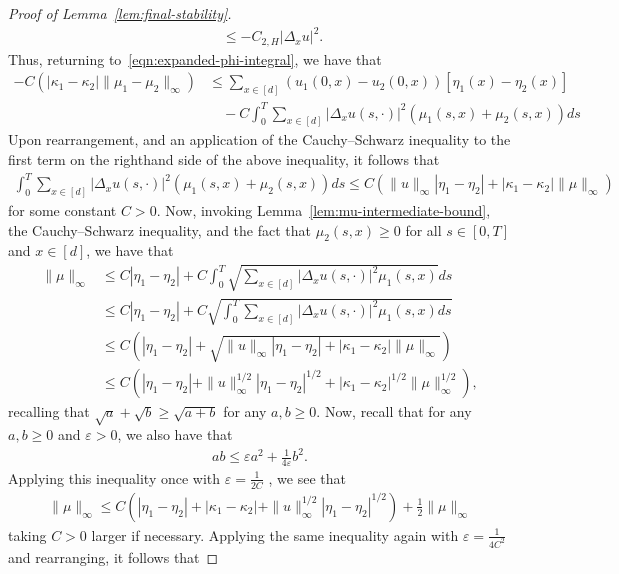 \documentclass[11pt,reqno]{amsart}
\numberwithin{equation}{section}
\theoremstyle{plain}
\newcommand{\1}{\boldsymbol{\mathbbm{1}}}
\begin{document}
\begin{proof}[Proof of Lemma~\ref{lem:final-stability}]
\begin{align*}
    &\quad \leq -C_{2, H} |\Delta_x u|^2.
\end{align*}
Thus, returning to~\eqref{eqn:expanded-phi-integral}, we have that
\begin{align*}
    -C(|\kappa_1 - \kappa_2| \|\mu_1 - \mu_2\|_\infty) &\leq \sum_{x \in [d]} (u_1(0, x) - u_2(0, x)) [\eta_1(x) - \eta_2(x)] \\
    &\quad - C\int_0^T \sum_{x \in [d]} |\Delta_x u(s, \cdot)|^2 (\mu_1(s, x) + \mu_2(s, x)) ds
\end{align*}
Upon rearrangement, and an application of the Cauchy--Schwarz inequality to the first term on the righthand side of the above inequality, it follows that
\begin{align*}
    \int_0^T \sum_{x \in [d]} |\Delta_x u(s, \cdot)|^2 (\mu_1(s, x) + \mu_2(s, x)) ds \leq C(\|u\|_\infty |\eta_1 - \eta_2| + |\kappa_1 - \kappa_2| \|\mu\|_\infty)
\end{align*}
for some constant $C > 0$. Now, invoking Lemma~\ref{lem:mu-intermediate-bound}, the Cauchy--Schwarz inequality, and the fact that $\mu_2(s, x) \geq 0$ for all $s \in [0, T]$ and $x \in [d]$, we have that
\begin{align*}
    \|\mu\|_\infty &\leq C|\eta_1 - \eta_2| + C \int_0^T \sqrt{\sum_{x \in [d]} |\Delta_x u(s, \cdot)|^2 \mu_1(s, x)} ds \\
    &\leq C|\eta_1 - \eta_2| + C \sqrt{\int_0^T \sum_{x \in [d]} |\Delta_x u(s, \cdot)|^2 \mu_1(s, x) ds} \\
    &\leq C(|\eta_1 - \eta_2| + \sqrt{\|u\|_\infty |\eta_1 - \eta_2| + |\kappa_1 - \kappa_2| \|\mu\|_\infty}) \\
    &\leq C(|\eta_1 - \eta_2| + \|u\|_\infty^{1/2} |\eta_1 - \eta_2|^{1/2} + |\kappa_1 - \kappa_2|^{1/2} \|\mu\|_\infty^{1/2}),
\end{align*}
recalling that $\sqrt{a} + \sqrt{b} \geq \sqrt{a + b}$ for any $a, b \geq 0$. Now, recall that for any $a, b \geq 0$ and $\varepsilon > 0$, we also have that
\begin{align*}
    ab \leq \varepsilon a^2 + \frac{1}{4 \varepsilon} b^2.
\end{align*}
Applying this inequality once with $\varepsilon = \frac{1}{2C}$ , we see that
\begin{align*}
    \|\mu\|_\infty \leq C(|\eta_1 - \eta_2| + |\kappa_1 - \kappa_2| + \|u\|_\infty^{1/2} |\eta_1 - \eta_2|^{1/2}) + \frac{1}{2}\|\mu\|_\infty
\end{align*}
taking $C > 0$ larger if necessary. Applying the same inequality again with $\varepsilon = \frac{1}{4C^2}$ and rearranging, it follows that

\end{proof}
\end{document}
